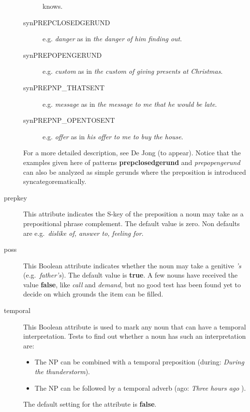 \begin{description}
\begin{description}
{knows}.
  \item [synPREPCLOSEDGERUND] e.g. {\em danger} as in {\em the danger of him 
finding out}. 
  \item [synPREPOPENGERUND] e.g. {\em custom} as in {\em the custom of giving 
presents at Christmas}.
  \item [synPREPNP\_THATSENT] e.g. {\em message} as in {\em the message to me 
that he would be late}.
  \item [synPREPNP\_OPENTOSENT] e.g. {\em offer} as in {\em his offer to me to 
buy the house}.
\end{description}
For a more detailed description, see De Jong (to appear). Notice that the 
examples given here of patterns {\bf prepclosedgerund} and {\em prepopengerund}
can also be analyzed as simple gerunds where the preposition is introduced 
syncategorematically.

\item[prepkey] This attribute indicates the S-key of the preposition 
a noun may take as a prepositional phrase complement.
The default value is zero. Non defaults are e.g.\ {\em dislike of, answer to,
feeling for\/}.

\item[poss] This Boolean attribute indicates whether the noun may take a 
genitive {\em 's\/} (e.g.\ {\em father's\/}). The default value is {\bf true}. 
A few nouns have received the value {\bf 
false}, like {\em call\/} and {\em demand\/}, but no good test has been found 
yet to decide on which grounds the item can be filled.

\item[temporal] This Boolean attribute is used to mark any noun that can have a 
temporal interpretation. Tests to find out whether a noun has such an 
interpretation are:
  \begin{itemize}
  \item The NP can be combined with a temporal preposition (during: {\em During 
the thunderstorm\/}).
  \item The NP can be followed by a temporal adverb (ago: {\em Three hours ago
\/}).
  \end{itemize}
The default setting for the attribute is {\bf false}.


\end{description}
